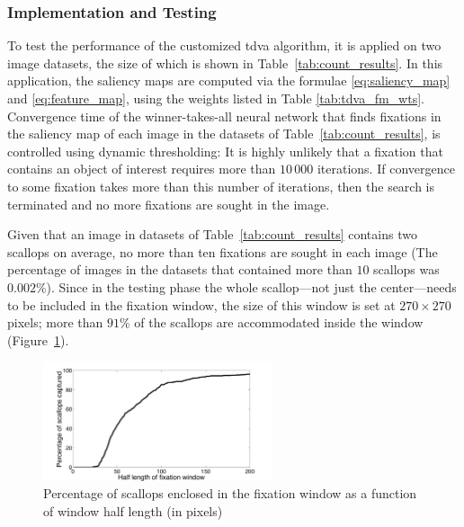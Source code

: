 \documentclass {udthesis}
\begin{document}
                                                   

\subsubsection{Implementation and Testing}\label{sec:tdva-testing}

To test the performance of the customized \gls{tdva} algorithm, it is applied on
two image datasets, the size of which is shown in Table~\ref{tab:count_results}.
In this application, the saliency maps are computed via the formulae 
\eqref{eq:saliency_map} and \eqref{eq:feature_map},
using the weights listed in Table \ref{tab:tdva_fm_wts}.
Convergence time of the winner-takes-all neural network that finds fixations in the saliency map of each image in the datasets of Table~\ref{tab:count_results}, is controlled using dynamic thresholding:
It is highly unlikely that a fixation that contains an object of interest
requires more than $10\,000$ iterations. If convergence to some fixation takes 
more than this number of iterations, 
then the search is terminated and no more fixations
are sought in the image.

Given that an image in datasets of
Table~\ref{tab:count_results} contains two scallops on average, no more than
ten fixations are sought in each image (The percentage of images
in the datasets that contained more than $10$ scallops 
was $0.002\%$).
Since in the testing phase the whole scallop---not just the center---needs to be included in the fixation window, the size of this window is set at
$270\times270$ pixels; more than $91$\% of the scallops are accommodated inside the window (Figure~\ref{fig:window_length}). 

\begin{figure}
  \centering
  \includegraphics[width=0.60\textwidth,natwidth=800,natheight=600]{windowlength.pdf}
  \caption[Scallop fixation window dimension analysis]{Percentage of scallops enclosed in the fixation window as a function of
  window half length (in pixels)}
  \label{fig:window_length}
\end{figure}
\end{document}
